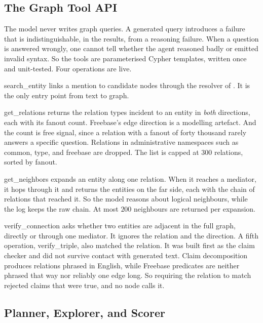 \subsection{The Graph Tool API}\label{sec:tools}

The model never writes graph queries. A generated query introduces a failure
that is indistinguishable, in the results, from a reasoning failure. When a
question is answered wrongly, one cannot tell whether the agent reasoned badly
or emitted invalid syntax. So the tools are parameterised Cypher templates,
written once and unit-tested. Four operations are live.

\textsf{search\_entity} links a mention to candidate nodes through the resolver
of . It is the only entry point from text to graph.

\textsf{get\_relations} returns the relation types incident to an entity in
\emph{both} directions, each with its fanout count. Freebase's edge direction is
a modelling artefact. And the count is free signal, since a relation with a
fanout of forty thousand rarely answers a specific question. Relations in
administrative namespaces such as \textsf{common}, \textsf{type}, and
\textsf{freebase} are dropped. The list is capped at $300$ relations, sorted by
fanout.

\textsf{get\_neighbors} expands an entity along one relation. When it reaches a
mediator, it hops through it and returns the entities on the far side, each with
the chain of relations that reached it. So the model reasons about logical
neighbours, while the log keeps the raw chain. At most $200$ neighbours are
returned per expansion.

\textsf{verify\_connection} asks whether two entities are adjacent in the full
graph, directly or through one mediator. It ignores the relation and the
direction. A fifth operation, \textsf{verify\_triple}, also matched the
relation. It was built first as the claim checker and did not survive contact
with generated text. Claim decomposition produces relations phrased in English,
while Freebase predicates are neither phrased that way nor reliably one edge
long. So requiring the relation to match rejected claims that were true, and no
node calls it.

\subsection{Planner, Explorer, and Scorer}\label{sec:explorer}

